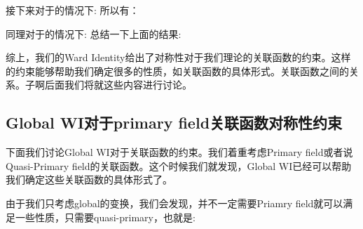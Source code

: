 接下来对于的情况下:
所以有：

同理对于的情况下:
总结一下上面的结果:

综上，我们的Ward Identity给出了对称性对于我们理论的关联函数的约束。这样的约束能够帮助我们确定很多的性质，如关联函数的具体形式。关联函数之间的关系。子啊后面我们将就这些内容进行讨论。

\subsection{Global WI对于primary field关联函数对称性约束}
下面我们讨论Global WI对于关联函数的约束。我们着重考虑Primary field或者说Quasi-Primary field的关联函数。这个时候我们就发现，Global WI已经可以帮助我们确定这些关联函数的具体形式了。

由于我们只考虑global的变换，我们会发现，并不一定需要Priamry field就可以满足一些性质，只需要quasi-primary，也就是:

